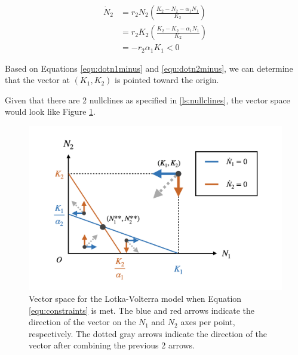 \begin{equation}
  \label{equ:dotn2minus}
  \begin{aligned}
    \dot N_2
    &= r_2 N_2 \left( \frac {K_2 - N_2 - \alpha_1 N_1} {K_2} \right) \\
    &= r_2 K_2 \left( \frac {K_2 - K_2 - \alpha_1 N_1} {K_2} \right) \\
    &= - r_2 \alpha_1 K_1 < 0
  \end{aligned}
\end{equation}

Based on Equations \ref{equ:dotn1minus} and \ref{equ:dotn2minus}, we can determine that the vector at $(K_1, K_2)$ is pointed toward the origin.

Given that there are 2 nullclines as specified in \ref{ls:nullclines}, the vector space would look like Figure \ref{fig:vecspace}.

\begin{figure}[h]
  \centering
  \includegraphics[width = \textwidth]{fig/graph_002.png}
  \caption {Vector space for the Lotka-Volterra model when Equation \ref{equ:constraints} is met. The blue and red arrows indicate the direction of the vector on the $N_1$ and $N_2$ axes per point, respectively. The dotted gray arrows indicate the direction of the vector after combining the previous 2 arrows.}
  \label{fig:vecspace}
\end{figure}

